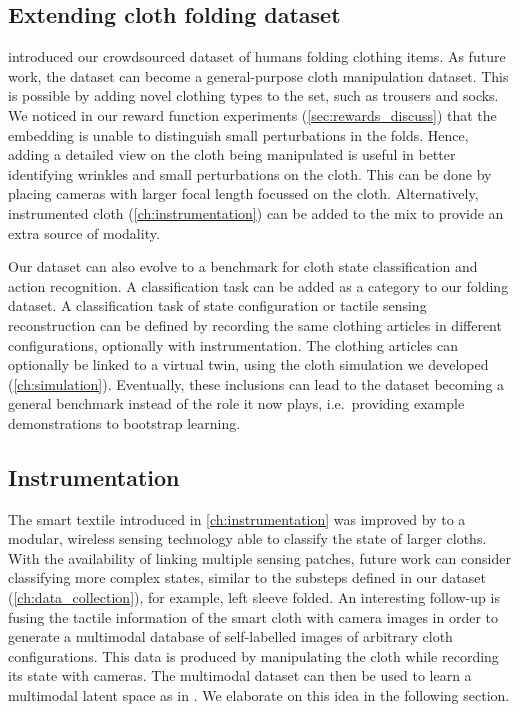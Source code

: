 \documentclass[\home/main.tex]{subfiles}
\begin{document}
\subsection{Extending cloth folding dataset}
 introduced our crowdsourced dataset of humans folding clothing items.
As future work, the dataset can become a general-purpose cloth manipulation dataset. This is possible by adding novel clothing types to the set, such as trousers and socks.
We noticed in our reward function experiments (\cref{sec:rewards_discuss}) that the embedding is unable to distinguish small perturbations in the folds. Hence, adding a detailed view on the cloth being manipulated is useful in better identifying wrinkles and small perturbations on the cloth. This can be done by placing cameras with larger focal length focussed on the cloth. Alternatively, instrumented cloth (\cref{ch:instrumentation}) can be added to the mix to provide an extra source of modality.

Our dataset can also evolve to a benchmark for cloth state classification and action recognition.
A classification task can be added as a category to our folding dataset. A classification task of state configuration or tactile sensing reconstruction can be defined by recording the same clothing articles in different configurations, optionally with instrumentation. The clothing articles can optionally be linked to a virtual twin, using the cloth simulation we developed (\cref{ch:simulation}).
Eventually, these inclusions can lead to the dataset becoming a general benchmark instead of the role it now plays, i.e.\ providing example demonstrations to bootstrap learning.

\subsection{Instrumentation}
The smart textile introduced in \cref{ch:instrumentation} was improved by \textcite{Proesmans2022} to a modular, wireless sensing technology able to classify the state of larger cloths. With the availability of linking multiple sensing patches, future work can consider classifying more complex states, similar to the substeps defined in our dataset (\cref{ch:data_collection}), for example, left sleeve folded. An interesting follow-up is fusing the tactile information of the smart cloth with camera images in order to generate a multimodal database of self-labelled images of arbitrary cloth configurations. This data is produced by manipulating the cloth while recording its state with cameras. The multimodal dataset can then be used to learn a multimodal latent space as in \autocite{Lee2019}. We elaborate on this idea in the following section.
\end{document}
